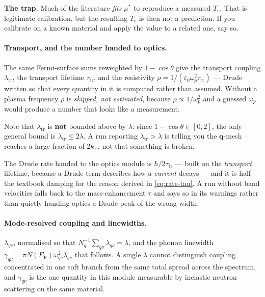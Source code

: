 \begin{calnote}
\textbf{The trap.} Much of the literature \emph{fits} $\mu^*$ to reproduce a
measured $T_\mathrm{c}$. That is legitimate calibration, but the resulting
$T_\mathrm{c}$ is then not a prediction. If you calibrate on a known material
and apply the value to a related one, say so.
\end{calnote}

\paragraph{Transport, and the number handed to optics.} The same Fermi-surface
sums reweighted by $1 - \cos\theta$ give the transport coupling
$\lambda_{\mathrm{tr}}$, the transport lifetime $\tau_{\mathrm{tr}}$, and the
resistivity $\rho = 1/(\varepsilon_0\omega_p^2\tau_{\mathrm{tr}})$ --- Drude
written so that every quantity in it is computed rather than assumed. Without a
plasma frequency $\rho$ is \emph{skipped, not estimated}, because
$\rho \propto 1/\omega_p^2$ and a guessed $\omega_p$ would produce a number
that looks like a measurement.

Note that $\lambda_{\mathrm{tr}}$ is \textbf{not} bounded above by $\lambda$:
since $1-\cos\theta \in [0,2]$, the only general bound is
$\lambda_{\mathrm{tr}} \le 2\lambda$. A run reporting
$\lambda_{\mathrm{tr}} > \lambda$ is telling you the $\mathbf{q}$-mesh reaches a
large fraction of $2k_\mathrm{F}$, not that something is broken.

The Drude rate handed to the optics module is
$\hbar/2\tau_{\mathrm{tr}}$ --- built on the \emph{transport} lifetime, because
a Drude term describes how a \emph{current} decays --- and it is half the
textbook damping for the reason derived in \eqref{eq:rate-tau}. A run without
band velocities falls back to the mass-enhancement $\tau$ and says so in its
warnings rather than quietly handing optics a Drude peak of the wrong width.

\paragraph{Mode-resolved coupling and linewidths.} $\lambda_{q\nu}$,
normalised so that $N_q^{-1}\sum_{q\nu}\lambda_{q\nu} = \lambda$, and the
phonon linewidth $\gamma_{q\nu} = \pi N(E_\mathrm{F})\omega_{q\nu}^2
\lambda_{q\nu}$ that follows. A single $\lambda$ cannot distinguish coupling
concentrated in one soft branch from the same total spread across the
spectrum, and $\gamma_{q\nu}$ is the one quantity in this module measurable by
inelastic neutron scattering on the same material.

